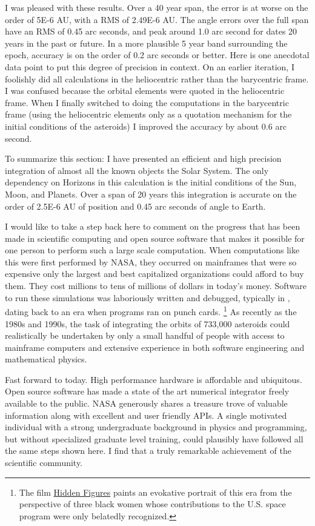 I was pleased with these results.
Over a 40 year span, the error is at worse on the order of 5E-6 AU, with a RMS of 2.49E-6 AU.
The angle errors over the full span have an RMS of 0.45 arc seconds,
and peak around 1.0 arc second for dates 20 years in the past or future.
In a more plausible 5 year band surrounding the epoch, accuracy is on the order of 0.2 arc seconds or better.
Here is one anecdotal data point to put this degree of precision in context.
On an earlier iteration, I foolishly did all calculations in the heliocentric rather than the barycentric frame.
I was confused because the orbital elements were quoted in the heliocentric frame.
When I finally switched to doing the computations in the barycentric frame 
(using the heliocentric elements only as a quotation mechanism for the initial conditions of the asteroids)
I improved the accuracy by about 0.6 arc second.

To summarize this section: I have presented an efficient and high precision integration of almost all the known objects the Solar System.
The only dependency on Horizons in this calculation is the initial conditions of the Sun, Moon, and Planets.
Over a span of 20 years this integration is accurate on the order of 2.5E-6 AU of position and 0.45 arc seconds of angle to Earth.

I would like to take a step back here to comment on the progress that has been made in scientific computing and open source software
that makes it possible for one person to perform such a large scale computation.
When computations like this were first performed by NASA, they occurred on mainframes that were so expensive only the largest 
and best capitalized organizations could afford to buy them.
They cost millions to tens of millions of dollars in today's money.
Software to run these simulations was laboriously written and debugged, typically in , dating back to an era when programs ran on punch cards.
\footnote{The film \href{https://en.wikipedia.org/wiki/Hidden_Figures}{Hidden Figures} paints an evokative portrait of this era
from the perspective of three black women whose contributions to the U.S. space program were only belatedly recognized.}
As recently as the 1980s and 1990s, the task of integrating the orbits of 733,000 asteroids could realistically be undertaken by only a small
handful of people with access to mainframe computers and extensive experience in both software engineering and mathematical physics.

Fast forward to today.  
High performance hardware is affordable and ubiquitous.
Open source software has made a state of the art numerical integrator freely available to the public.
NASA generously shares a treasure trove of valuable information along with excellent and user friendly APIs.
A single motivated individual with a strong undergraduate background in physics and programming,
but without specialized graduate level training, could plausibly have followed all the same steps shown here.
I find that a truly remarkable achievement of the scientific community.

